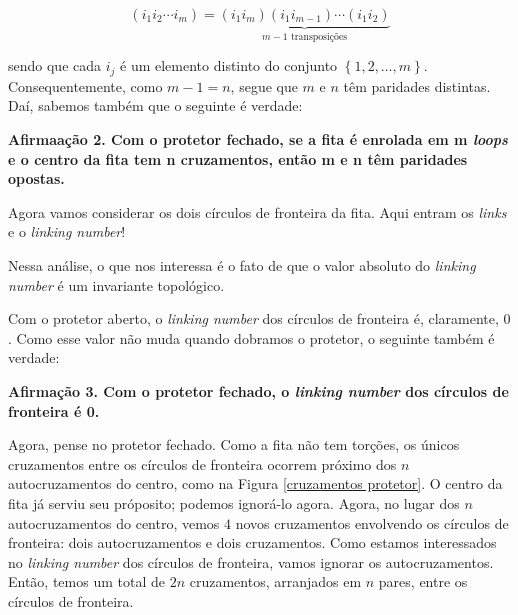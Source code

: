 \documentclass[a4paper,portuguese,11pt,twoside, leqno]{book}
\theoremstyle{definition}
\begin{document}
	\begin{equation*}
	(i_1i_2\cdots i_m) = \underbrace{(i_1i_m)(i_1i_{m-1})\cdots(i_1i_2)}_{m-1\text{ transposições}}
	\end{equation*}
	\par\vspace{0.3cm} sendo que cada $i_j$ é um elemento distinto do conjunto $\left\{1, 2, \dots, m \right\}$. Consequentemente, como $m-1=n$, segue que $m$ e $n$ têm paridades distintas. Daí, sabemos também que o seguinte é verdade:
	\begin{center}
		\textbf{Afirmaação 2. Com o protetor fechado, se a fita é enrolada em m \textit{loops} e o centro da fita tem n cruzamentos, então m e n têm paridades opostas.}
	\end{center}
	\par\vspace{0.3cm} Agora vamos considerar os dois círculos de fronteira da fita. Aqui entram os \textit{links} e o \textit{linking number}!
	\par\vspace{0.3cm} Nessa análise, o que nos interessa é o fato de que o valor absoluto do \textit{linking number} é um invariante topológico.
	\par\vspace{0.3cm} Com o protetor aberto, o \textit{linking number} dos círculos de fronteira é, claramente, $0$. Como esse valor não muda quando dobramos o protetor, o seguinte também é verdade:
	\begin{center}
		\textbf{Afirmação 3. Com o protetor fechado, o \textit{linking number} dos círculos de fronteira é 0.}
	\end{center}
	\par\vspace{0.3cm} Agora, pense no protetor fechado. Como a fita não tem torções, os únicos cruzamentos entre os círculos de fronteira ocorrem próximo dos $n$ autocruzamentos do centro, como na Figura \eqref{cruzamentos protetor}. O centro da fita já serviu seu próposito; podemos ignorá-lo agora. Agora, no lugar dos $n$ autocruzamentos do centro, vemos $4$ novos cruzamentos envolvendo os círculos de fronteira: dois autocruzamentos e dois cruzamentos. Como estamos interessados no \textit{linking number} dos círculos de fronteira, vamos ignorar os autocruzamentos. Então, temos um total de $2n$ cruzamentos, arranjados em $n$ pares, entre os círculos de fronteira.
	
\end{document}
